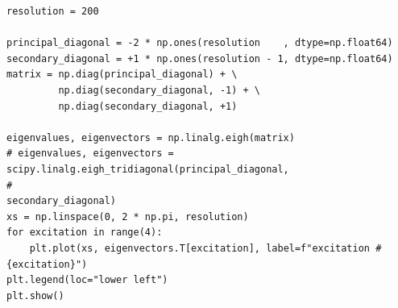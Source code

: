 \begin{frame}[fragile]
%
\begin{codebox}
\begin{verbatim}
resolution = 200

principal_diagonal = -2 * np.ones(resolution    , dtype=np.float64)
secondary_diagonal = +1 * np.ones(resolution - 1, dtype=np.float64)
matrix = np.diag(principal_diagonal) + \
         np.diag(secondary_diagonal, -1) + \
         np.diag(secondary_diagonal, +1)

eigenvalues, eigenvectors = np.linalg.eigh(matrix)
# eigenvalues, eigenvectors = scipy.linalg.eigh_tridiagonal(principal_diagonal, 
#                                                           secondary_diagonal)
xs = np.linspace(0, 2 * np.pi, resolution)
for excitation in range(4):
    plt.plot(xs, eigenvectors.T[excitation], label=f"excitation #{excitation}")
plt.legend(loc="lower left")
plt.show()
\end{verbatim}
\end{codebox}
%
\end{frame}


